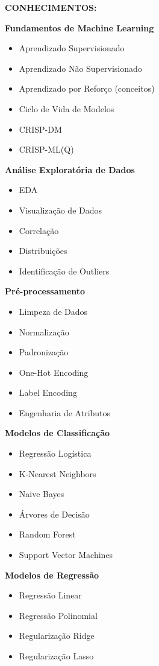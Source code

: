 \textbf{CONHECIMENTOS:}

\textbf{Fundamentos de Machine Learning}

\begin{itemize}
\item Aprendizado Supervisionado
\item Aprendizado Não Supervisionado
\item Aprendizado por Reforço (conceitos)
\item Ciclo de Vida de Modelos
\item CRISP-DM
\item CRISP-ML(Q)
\end{itemize}

\textbf{Análise Exploratória de Dados}

\begin{itemize}
\item EDA
\item Visualização de Dados
\item Correlação
\item Distribuições
\item Identificação de Outliers
\end{itemize}

\textbf{Pré-processamento}

\begin{itemize}
\item Limpeza de Dados
\item Normalização
\item Padronização
\item One-Hot Encoding
\item Label Encoding
\item Engenharia de Atributos
\end{itemize}

\textbf{Modelos de Classificação}

\begin{itemize}
\item Regressão Logística
\item K-Nearest Neighbors
\item Naive Bayes
\item Árvores de Decisão
\item Random Forest
\item Support Vector Machines
\end{itemize}

\textbf{Modelos de Regressão}

\begin{itemize}
\item Regressão Linear
\item Regressão Polinomial
\item Regularização Ridge
\item Regularização Lasso
\end{itemize}

